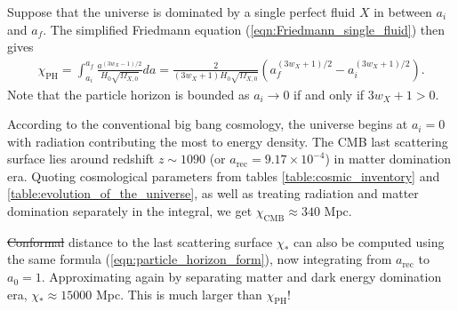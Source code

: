 \documentclass[a4paper,12pt,times,custombib,print,index]{Classes/PhDThesisPSnPDF} %
\providecommand{\DIFadd}[1]{{\protect\color{blue}\uwave{#1}}} %
\providecommand{\DIFdel}[1]{{\protect\color{red}\sout{#1}}}                      %
\providecommand{\DIFaddbegin}{} %
\providecommand{\DIFaddend}{} %
\providecommand{\DIFdelbegin}{} %
\providecommand{\DIFdelend}{} %
\newcommand{\DIFscaledelfig}{0.5}
\newlength{\DIFdelgraphicswidth} %
\newlength{\DIFdelgraphicsheight} %
\newcommand{\DIFaddincludegraphics}[2][]{{\color{blue}\fbox{\DIFOincludegraphics[#1]{#2}}}} %
\newcommand{\DIFdelincludegraphics}[2][]{%
\sbox{\DIFdelgraphicsbox}{\DIFOincludegraphics[#1]{#2}}%
\settoboxwidth{\DIFdelgraphicswidth}{\DIFdelgraphicsbox} %
\settoboxtotalheight{\DIFdelgraphicsheight}{\DIFdelgraphicsbox} %
\scalebox{\DIFscaledelfig}{%
\parbox[b]{\DIFdelgraphicswidth}{\usebox{\DIFdelgraphicsbox}\\[-\baselineskip] \rule{\DIFdelgraphicswidth}{0em}}\llap{\resizebox{\DIFdelgraphicswidth}{\DIFdelgraphicsheight}{%
\setlength{\unitlength}{\DIFdelgraphicswidth}%
\begin{picture}(1,1)%
\thicklines\linethickness{2pt} %
{\color[rgb]{1,0,0}\put(0,0){\framebox(1,1){}}}%
{\color[rgb]{1,0,0}\put(0,0){\line( 1,1){1}}}%
{\color[rgb]{1,0,0}\put(0,1){\line(1,-1){1}}}%
\end{picture}%
}\hspace*{3pt}}} %
} %
\DeclareRobustCommand{\DIFaddbegin}{\DIFOaddbegin \let\includegraphics\DIFaddincludegraphics} %
\DeclareRobustCommand{\DIFaddend}{\DIFOaddend \let\includegraphics\DIFOincludegraphics} %
\DeclareRobustCommand{\DIFdelbegin}{\DIFOdelbegin \let\includegraphics\DIFdelincludegraphics} %
\DeclareRobustCommand{\DIFdelend}{\DIFOaddend \let\includegraphics\DIFOincludegraphics} %
\begin{document}
Suppose that the universe is dominated by a single perfect fluid $X$ in between $a_i$ and $a_f$. The simplified Friedmann equation (\ref{eqn:Friedmann_single_fluid}) then gives
\begin{align}
	\chi_\text{PH} = \int_{a_i}^{a_f} \frac{a^{(3w_X - 1)/2}}{H_0 \sqrt{\Omega_{X,0}}} da = \frac{2}{(3w_X+1) H_0 \sqrt{\Omega_{X,0}}} \left( a_f^{(3w_X+1)/2} - a_i^{(3w_X+1)/2} \right). \label{eqn:particle_horizon_form}
\end{align}
Note that the particle horizon is bounded as $a_i \rightarrow 0$ if and only if $3w_X+1>0$.

According to the conventional big bang cosmology, the universe begins at $a_i=0$ with radiation contributing the most to energy density. The CMB last scattering surface lies around redshift $z \sim 1090$ (or $a_\text{rec}=9.17\times 10^{-4}$) in \DIFaddbegin \DIFadd{the }\DIFaddend matter domination era. Quoting cosmological parameters from tables \ref{table:cosmic_inventory} and \ref{table:evolution_of_the_universe}, as well as treating radiation and matter domination separately in the integral, we get $\chi_\text{CMB} \approx 340$ Mpc.

\DIFdelbegin \DIFdel{Conformal }\DIFdelend \DIFaddbegin \DIFadd{The conformal }\DIFaddend distance to the last scattering surface $\chi_*$ can also be computed using the same formula (\ref{eqn:particle_horizon_form}), now integrating from $a_\text{rec}$ to $a_0=1$. Approximating again by separating matter and dark energy domination era, $\chi_* \approx 15000$ Mpc. This is much larger than $\chi_\text{PH}$!
\end{document}
